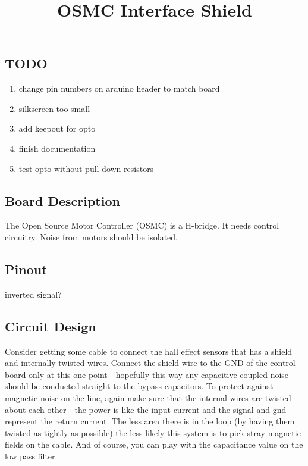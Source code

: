\documentclass[letterpaper,12pt,notitlepage]{report}
\begin{document}
\title{OSMC Interface Shield}
\author{}
\date{}
\maketitle

\subsection{TODO}
\begin{enumerate}
 \item change pin numbers on arduino header to match board
 \item silkscreen too small
 \item add keepout for opto
 \item finish documentation
 \item test opto without pull-down resistors
\end{enumerate}

\subsection{Board Description}
The Open Source Motor Controller (OSMC) is a H-bridge.  It needs control circuitry.  Noise from motors should be isolated.


\subsection{Pinout}

inverted signal?

\subsection{Circuit Design}

Consider getting some cable to connect the hall effect sensors that has a shield and internally twisted wires. Connect the shield wire to the GND of the control board only at this one point - hopefully this way any capacitive coupled noise should be conducted straight to the bypass capacitors. To protect against magnetic noise on the line, again make sure that the internal wires are twisted about each other - the power is like the input current and the signal and gnd represent the return current. The less area there is in the loop (by having them twisted as tightly as possible) the less likely this system is to pick stray magnetic fields on the cable. And of course, you can play with the capacitance value on the low pass filter. 
\end{document}
